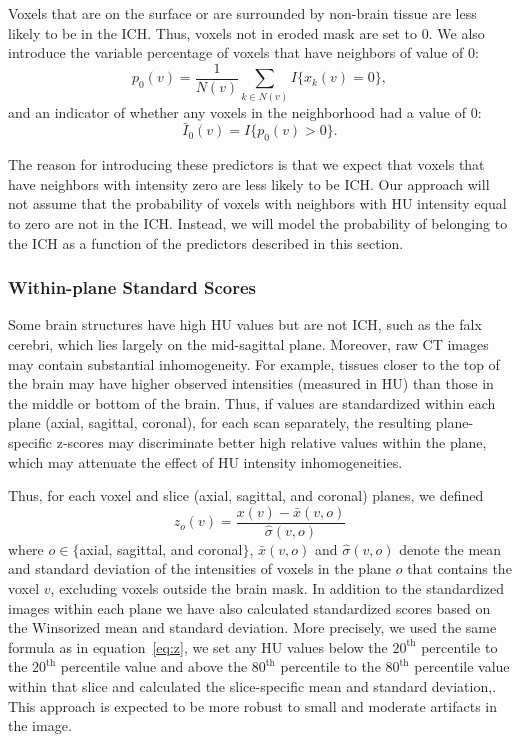 \documentclass{elsarticle_nonatbib}\usepackage[]{graphicx}\usepackage[]{color}
\begin{document}
Voxels that are on the surface or are surrounded by non-brain tissue are less likely to be in the ICH.  Thus, voxels not in eroded mask are set to $0$.
We also introduce the variable percentage of voxels that have neighbors of value of $0$:
\begin{equation}
p_{0}(v) = \frac{1}{N(v)} \sum_{k \in N(v)} I\{ x_k(v) = 0 \}, \label{eq:pct0}
\end{equation}
and an indicator of whether any voxels in the neighborhood had a value of $0$:
\begin{equation}
\bar{I}_{0}(v) = I\{ p_{0}(v) > 0 \}. \label{eq:I0}
\end{equation}

The reason for introducing these predictors is that we expect that voxels that have neighbors with intensity zero are less likely to be ICH. Our approach will not assume that the probability of voxels with neighbors with HU intensity equal to zero are not in the ICH. Instead, we will model the probability of belonging to the ICH as a function of the predictors described in this section.

\subsubsection{Within-plane Standard Scores} Some brain structures have high HU values but are not ICH, such as the falx cerebri, which lies largely on the mid-sagittal plane.  Moreover, raw CT images may contain substantial inhomogeneity. For example, tissues closer to the top of the brain may have higher observed intensities (measured in HU) than those in the middle or bottom of the brain.  Thus, if values are standardized within each plane (axial, sagittal, coronal), for each scan separately, the resulting plane-specific z-scores may discriminate better high relative values within the plane, which may attenuate the effect of HU intensity inhomogeneities.

Thus, for each voxel and slice (axial, sagittal, and coronal) planes, we defined
\begin{equation}
z_{o}(v) = \frac{x(v) - \bar{x}(v, o)}{\hat{\sigma}(v, o)} \label{eq:z}
\end{equation}
where $o \in \{$axial, sagittal, and coronal$\}$, $\bar{x}(v, o)$ and $\hat{\sigma}(v, o)$ denote the mean and standard deviation of the intensities of voxels in the plane $o$ that contains the voxel $v$, excluding voxels outside the brain mask.   In addition to the standardized images within each plane we have also calculated standardized scores based on the Winsorized mean and standard deviation.  More precisely, we used the same formula as in equation~\eqref{eq:z}, we set any HU values below the $20^{\text{th}}$ percentile to the $20^{\text{th}}$ percentile value and above the $80^{\text{th}}$ percentile to the $80^{\text{th}}$ percentile value within that slice and calculated the slice-specific mean and standard deviation,. This approach is expected to be more robust to small and moderate artifacts in the image.
\end{document}
